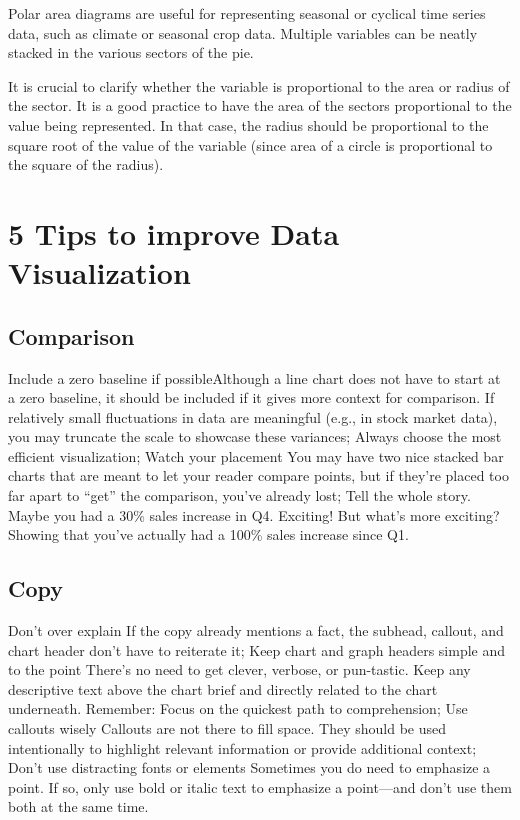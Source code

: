 \documentclass[]{book}
\theoremstyle{definition}
\theoremstyle{definition}
\theoremstyle{definition}
\theoremstyle{remark}
\begin{document}
Polar area diagrams are useful for representing seasonal or cyclical
time series data, such as climate or seasonal crop data. Multiple
variables can be neatly stacked in the various sectors of the pie.

It is crucial to clarify whether the variable is proportional to the
area or radius of the sector. It is a good practice to have the area of
the sectors proportional to the value being represented. In that case,
the radius should be proportional to the square root of the value of the
variable (since area of a circle is proportional to the square of the
radius).

\section{5 Tips to improve Data
Visualization}\label{tips-to-improve-data-visualization}

\subsection{Comparison}\label{comparison}

Include a zero baseline if possibleAlthough a line chart does not have
to start at a zero baseline, it should be included if it gives more
context for comparison. If relatively small fluctuations in data are
meaningful (e.g., in stock market data), you may truncate the scale to
showcase these variances; Always choose the most efficient
visualization; Watch your placement You may have two nice stacked bar
charts that are meant to let your reader compare points, but if they're
placed too far apart to ``get'' the comparison, you've already lost;
Tell the whole story. Maybe you had a 30\% sales increase in Q4.
Exciting! But what's more exciting? Showing that you've actually had a
100\% sales increase since Q1.

\subsection{Copy}\label{copy}

Don't over explain If the copy already mentions a fact, the subhead,
callout, and chart header don't have to reiterate it; Keep chart and
graph headers simple and to the point There's no need to get clever,
verbose, or pun-tastic. Keep any descriptive text above the chart brief
and directly related to the chart underneath. Remember: Focus on the
quickest path to comprehension; Use callouts wisely Callouts are not
there to fill space. They should be used intentionally to highlight
relevant information or provide additional context; Don't use
distracting fonts or elements Sometimes you do need to emphasize a
point. If so, only use bold or italic text to emphasize a point---and
don't use them both at the same time.
\end{document}
